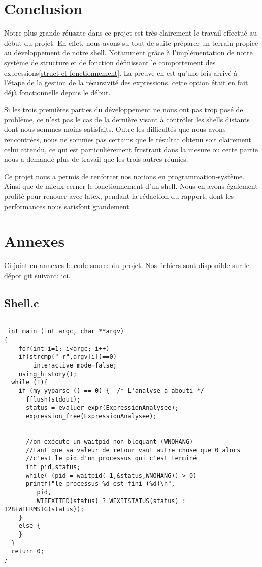 \documentclass[12pt]{article}
\begin{document}
\newpage
\section{Conclusion}

Notre plus grande réussite dans ce projet est très clairement le travail effectué au
début du projet. En effet, nous avons su tout de suite préparer un terrain propice au
développement de notre shell. Notamment grâce à l'implémentation de notre système de structure et 
de fonction définissant le comportement des expressions\ref{struct et fonctionnement}.
La preuve en est qu'une fois arrivé à l'étape de la gestion de la récursivité des expressions, 
cette option était en fait déjà fonctionnelle depuis le début.\newline

Si les trois premières parties du développement ne nous ont pas trop posé de problème, ce n'est pas le cas de la dernière visant à contrôler les shells distants dont nous sommes moins satisfaits. Outre les difficultés que nous avons rencontrées, nous ne sommes pas certains que le résultat obtenu soit clairement celui attendu, ce qui est particulièrement frustrant dans la mesure ou cette partie nous a demandé plus de travail que les trois autres réunies.\newline

Ce projet nous a permis de renforcer nos notions en programmation-système. Ainsi que de mieux cerner le fonctionnement d'un shell. Nous en avons également profité pour renouer avec latex, pendant la rédaction du rapport, dont les performances nous satisfont grandement.


\newpage
\section{Annexes}

Ci-joint en annexes le code source du projet. Nos fichiers sont disponible sur le dépot git suivant:
 \href{https://github.com/beziarum/shell.git}{ici}.

 \scriptsize
\subsection{Shell.c}
\label{main}
\begin{verbatim}

 int main (int argc, char **argv)
{
    for(int i=1; i<argc; i++)
	if(strcmp("-r",argv[i])==0)
	    interactive_mode=false;
    using_history();
  while (1){
    if (my_yyparse () == 0) {  /* L'analyse a abouti */
      fflush(stdout);
      status = evaluer_expr(ExpressionAnalysee);
      expression_free(ExpressionAnalysee);


      //on exécute un waitpid non bloquant (WNOHANG)
      //tant que sa valeur de retour vaut autre chose que 0 alors
      //c'est le pid d'un processus qui c'est terminé
      int pid,status;
      while( (pid = waitpid(-1,&status,WNOHANG)) > 0)
	  printf("le processus %d est fini (%d)\n",
		 pid,
		 WIFEXITED(status) ? WEXITSTATUS(status) : 128+WTERMSIG(status));
    }
    else {
    }
  }
  return 0;
}
\end{verbatim}
\end{document}

